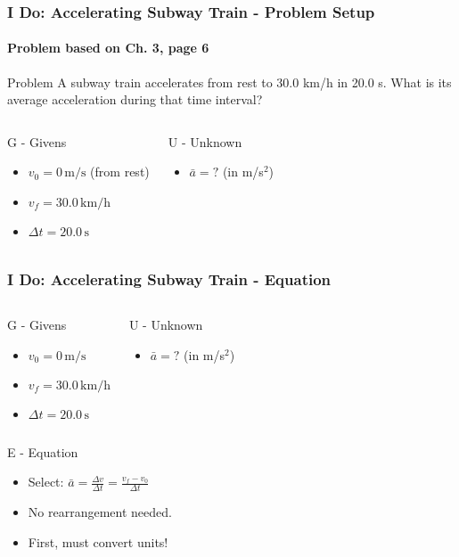 \documentclass{beamer}
\begin{document}
\begin{frame}
\frametitle{I Do: Accelerating Subway Train - Problem Setup}
\framesubtitle{Problem based on Ch. 3, page 6}
\begin{block}{Problem}
A subway train accelerates from rest to 30.0 km/h in 20.0 s. What is its average acceleration during that time interval?
\end{block}
\pause
\begin{columns}[T]
\begin{block}{G - Givens}
\begin{itemize}
    \item $v_0 = 0 \, \text{m/s}$ (from rest)
    \item $v_f = 30.0 \, \text{km/h}$
    \item $\Delta t = 20.0 \, \text{s}$
\end{itemize}
\end{block}
\pause
{}
\begin{block}{U - Unknown}
\begin{itemize}
    \item $\bar{a} = ?$ (in m/s$^2$)
\end{itemize}
\end{block}
\end{columns}
\end{frame}

\begin{frame}
\frametitle{I Do: Accelerating Subway Train - Equation}
\begin{columns}[T]
\begin{block}{G - Givens}
\begin{itemize}
    \item $v_0 = 0 \, \text{m/s}$
    \item $v_f = 30.0 \, \text{km/h}$
    \item $\Delta t = 20.0 \, \text{s}$
\end{itemize}
\end{block}
\pause
{}
\begin{block}{U - Unknown}
\begin{itemize}
    \item $\bar{a} = ?$ (in m/s$^2$)
\end{itemize}
\end{block}
\end{columns}
\pause
\begin{columns}[T]
\begin{block}{E - Equation}
\begin{itemize}
    \item Select: $\bar{a} = \frac{\Delta v}{\Delta t} = \frac{v_f - v_0}{\Delta t}$
    \item No rearrangement needed.
    \item \alert{First, must convert units!}
\end{itemize}
\end{block}
\end{columns}
\end{frame}
\end{document}
